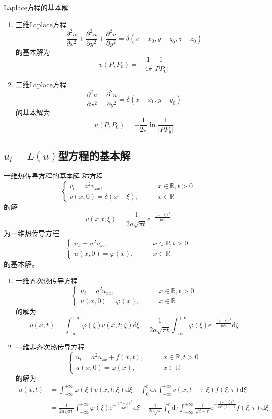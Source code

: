 \documentclass[lang = cn, scheme = chinese, thmcnt = section]{elegantbook}
\newcommand{\R}{\mathbb{R}}            %
\newcommand{\dd}{\mathrm{d}}           %
\newcommand{\ee}[1]{\mathrm{e}^{#1}}   %
\begin{document}
\begin{theorem}{Laplace方程的基本解}
	\begin{enumerate}
		\item 三维Laplace方程%
		$$
		\frac{\partial^2 u}{\partial x^2}
		+\frac{\partial^2 u}{\partial y^2}
		+\frac{\partial^2 u}{\partial y^2}
		=\delta(x-x_0,y-y_0,z-z_0)
		$$
		的基本解为%
		$$
		u(P,P_0)=-\frac{1}{4\pi}\frac{1}{|PP_0|}
		$$
		\item 二维Laplace方程%
		$$
		\frac{\partial^2 u}{\partial x^2}
		+\frac{\partial^2 u}{\partial y^2}
		=\delta(x-x_0,y-y_0)
		$$
		的基本解为%
		$$
		u(P,P_0)=-\frac{1}{2\pi}\ln\frac{1}{|PP_0|}
		$$
	\end{enumerate}
\end{theorem}

\subsection{$u_t=L(u)$型方程的基本解}

\begin{theorem}{一维热传导方程的基本解}
	称方程%
	$$
	\begin{cases}
		v_t=a^2v_{xx},\qquad & x\in\R,t>0\\
		v(x,0)=\delta(x-\xi),\qquad & x\in\R
	\end{cases}
	$$
	的解%
	$$
	v(x,t;\xi)=\frac{1}{2a\sqrt{\pi t}}\ee{-\frac{(x-\xi)^2}{4a^2t}}
	$$
	为一维热传导方程
	$$
	\begin{cases}
		u_t=a^2u_{xx},\qquad & x\in\R,t>0\\
		u(x,0)=\varphi(x),\qquad & x\in\R
	\end{cases}
	$$
	的基本解。
	\begin{enumerate}
		\item 一维齐次热传导方程
		$$
		\begin{cases}
			u_t=a^2u_{xx},\qquad & x\in\R,t>0\\
			u(x,0)=\varphi(x),\qquad & x\in\R
		\end{cases}
		$$
		的解为%
		$$
		u(x,t)
		=\int_{-\infty}^{+\infty}\varphi(\xi)v(x,t;\xi)\dd\xi
		=\frac{1}{2a\sqrt{\pi t}}\int_{-\infty}^{+\infty}\varphi(\xi)\ee{-\frac{(x-\xi)^2}{4a^2t}}\dd\xi
		$$
		\item 一维非齐次热传导方程
		$$
		\begin{cases}
			u_t=a^2u_{xx}+f(x,t),\qquad & x\in\R,t>0\\
			u(x,0)=\varphi(x),\qquad & x\in\R
		\end{cases}
		$$
		的解为%
		\begin{align*}
			u(x,t)
			& = \int_{-\infty}^{+\infty}\varphi(\xi)v(x,t;\xi)\dd\xi+\int_{0}^{t}\dd\tau\int_{-\infty}^{+\infty}v(x,t-\tau;\xi)f(\xi,\tau)\dd\xi\\
			& = \frac{1}{2a\sqrt{\pi t}}\int_{-\infty}^{+\infty}\varphi(\xi)\ee{-\frac{(x-\xi)^2}{4a^2t}}\dd\xi
			+\frac{1}{2a\sqrt{\pi }}\int_{0}^{t}\dd\tau\int_{-\infty}^{+\infty}\frac{1}{\sqrt{t-\tau}}\ee{-\frac{(x-\xi)^2}{4a^2(t-\tau)}}f(\xi,\tau)\dd\xi
		\end{align*}
	\end{enumerate}
\end{theorem}
\end{document}

